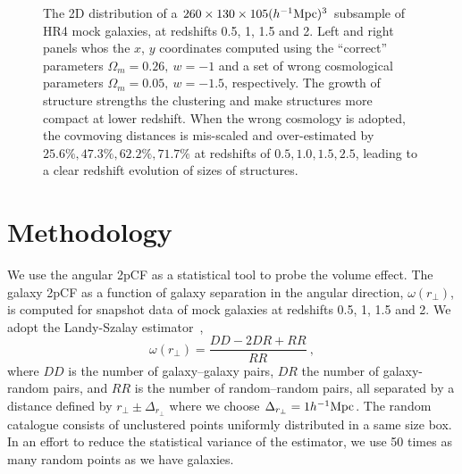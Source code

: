 \documentclass[iop]{emulateapj}
\begin{document}

\begin{figure}
   \caption{\label{fig_scatter}
  The 2D distribution of a $260\times130\times105 (h^{-1}{\rm Mpc})^3$ subsample of HR4 mock galaxies, 
  at redshifts 0.5, 1, 1.5 and 2.
  Left and right panels whos the $x$, $y$ coordinates computed using the ``correct'' parameters $\Omega_m=0.26,\ w=-1$ 
  and a set of wrong cosmological parameters $\Omega_m=0.05,\ w=-1.5$, respectively.
  The growth of structure strengths the clustering and make structures more compact at lower redshift.
  When the wrong cosmology is adopted, the covmoving distances is mis-scaled and over-estimated by $25.6\%,47.3\%,62.2\%,71.7\%$ at redshifts of $0.5,1.0,1.5,2.5$,
  leading to a clear redshift evolution of sizes of structures.
   }
\end{figure}

\section{Methodology}


We use the angular 2pCF as a statistical tool to probe the volume effect.
The galaxy 2pCF as a function of galaxy separation in the angular direction, $\omega(r_\perp)$, is computed for snapshot data of mock galaxies at redshifts 0.5, 1, 1.5 and 2.
We adopt the Landy-Szalay estimator~\citep{1993ApJ...412...64L},
\begin{equation}
\omega(r_\perp)=\frac{DD-2DR+RR}{RR}\ ,
\end{equation}
where $DD$ is the number of galaxy--galaxy pairs, 
$DR$ the number of galaxy-random pairs, 
and $RR$ is the number of random--random pairs, 
all separated by a distance defined by $r_\perp\pm\Delta_{r_\perp}$ where we choose $\Delta_{r_\perp}=1h^{-1}\rm Mpc$.
The random catalogue consists of unclustered points uniformly distributed in a same size box. 
In an effort to reduce the statistical variance of the estimator, we use 50 times as many random points as we have galaxies.
\end{document}
